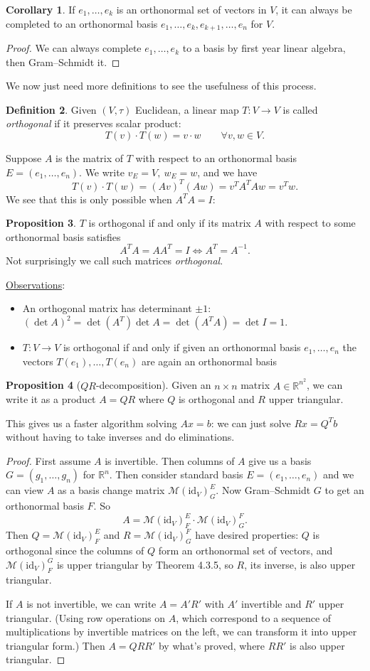 \documentclass[a4paper]{article}
\theoremstyle{definition}
\newtheorem{defn}{Definition}[subsection]
\newtheorem{prop}[defn]{Proposition}
\newtheorem{coro}[defn]{Corollary}
\begin{document}
\begin{coro}
If $e_1,\ldots,e_k$ is an orthonormal set of vectors in $V$, it can always be completed to an orthonormal basis $e_1,\ldots,e_k,e_{k+1},\ldots,e_n$ for $V$.
\end{coro}
\begin{proof}
We can always complete $e_1,\ldots,e_k$ to a basis by first year linear algebra, then Gram–Schmidt it.
\end{proof}
We now just need more definitions to see the usefulness of this process.
\begin{defn}
Given $(V,\tau)$ Euclidean, a linear map $T:V\rightarrow V$ is called \textit{orthogonal} if it preserves scalar product:
\[
T(v)\cdot T(w) = v\cdot w \qquad \forall v,w\in V.
\]
\end{defn}
Suppose $A$ is the matrix of $T$ with respect to an orthonormal basis $E=(e_1,\ldots,e_n)$. We write $v_E=V,\ w_E=w$, and we have
\[
T(v)\cdot T(w) = (Av)^T (Aw) = v^TA^TAw = v^Tw.
\]
We see that this is only possible when $A^TA=I$:
\begin{prop}
$T$ is orthogonal if and only if its matrix $A$ with respect to some orthonormal basis satisfies
\[
A^TA=AA^T=I \Leftrightarrow A^T=A^{-1}.
\]
Not surprisingly we call such matrices \textit{orthogonal}.
\end{prop}
\underline{Observations}:
\begin{itemize}
    \item An orthogonal matrix has determinant $\pm 1$:
    $(\det A)^2=\det(A^T)\det A=\det (A^TA)=\det I=1 .$
    \item $T:V\rightarrow V$ is orthogonal if and only if given an orthonormal basis $e_1,\ldots,e_n$ the vectors $T(e_1),\ldots,T(e_n)$ are again an orthonormal basis
\end{itemize}
\begin{prop}[$QR$-decomposition]
Given an $n\times n$ matrix $A\in \mathbb R^{n^2}$, we can write it as a product $A=QR$ where $Q$ is orthogonal and $R$ upper triangular.
\end{prop}
This gives us a faster algorithm solving $Ax=b$: we can just solve $Rx=Q^Tb$ without having to take inverses and do eliminations.
\begin{proof}
First assume $A$ is invertible. Then columns of $A$ give us a basis $G=(g_1,\ldots,g_n)$ for $\mathbb R^n$. Then consider standard basis $E=(e_1,\ldots,e_n)$ and we can view $A$ as a basis change matrix $\mathcal M (\text{id}_V)_G^E$. Now Gram–Schmidt $G$ to get an orthonormal basis $F$. So
\[
A=\mathcal M (\text{id}_V)_F^E \cdot \mathcal M (\text{id}_V)_G^F .
\]
Then $Q=\mathcal M (\text{id}_V)_F^E$ and $R=\mathcal M (\text{id}_V)_G^F$ have desired properties: $Q$ is orthogonal since the columns of $Q$ form an orthonormal set of vectors, and $\mathcal M (\text{id}_V)_F^G$ is upper triangular by Theorem 4.3.5, so $R$, its inverse, is also upper triangular.

If $A$ is not invertible, we can write $A=A'R'$ with $A'$ invertible and $R'$ upper triangular. (Using row operations on $A$, which correspond to a sequence of multiplications by invertible matrices on the left, we can transform it into upper triangular form.) Then $A=QRR'$ by what's proved, where $RR'$ is also upper triangular.
\end{proof}
\end{document}
